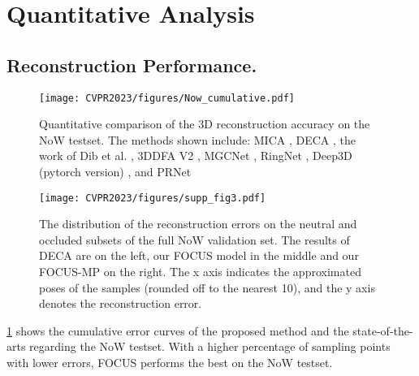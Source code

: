 \documentclass[10pt,twocolumn,letterpaper]{article}
\begin{document}
\section{Quantitative Analysis} 

\subsection{Reconstruction Performance.} 


\begin{figure}
  \centering
  
  \texttt{[image: CVPR2023/figures/Now\_cumulative.pdf]}
  
    \caption{Quantitative comparison of the 3D reconstruction accuracy on the NoW \cite{RingNet:CVPR:2019} testset. The methods shown include: MICA \cite{zielonka2022towards}, DECA \cite{DECA}, the work of Dib et al. \cite{Dib:ICCV:2021}, 3DDFA V2 \cite{Guo:ECCV:2020}, MGCNet \cite{Shang:ECCV:2020}, RingNet \cite{RingNet:CVPR:2019}, Deep3D (pytorch version) \cite{deng2019accurate}, and PRNet \cite{feng2018prn}}
 \label{Analysis: NoW_AUC}
\end{figure}

\begin{figure*}
  \centering
  
  \texttt{[image: CVPR2023/figures/supp\_fig3.pdf]}
  
    \caption{The distribution of the reconstruction errors on the neutral and occluded subsets of the full NoW validation set. The results of DECA \cite{DECA} are on the left, our FOCUS model in the middle and our FOCUS-MP on the right. The x axis indicates the approximated poses of the samples (rounded off to the nearest 10), and the y axis denotes the reconstruction error.}
 \label{Analysis: Occluded/unoccluded on Now}
\end{figure*}





\cref{Analysis: NoW_AUC} shows the cumulative error curves of the proposed method and the state-of-the-arts regarding the NoW testset. With a higher percentage of sampling points with lower errors, FOCUS performs the best on the NoW testset.
\end{document}
